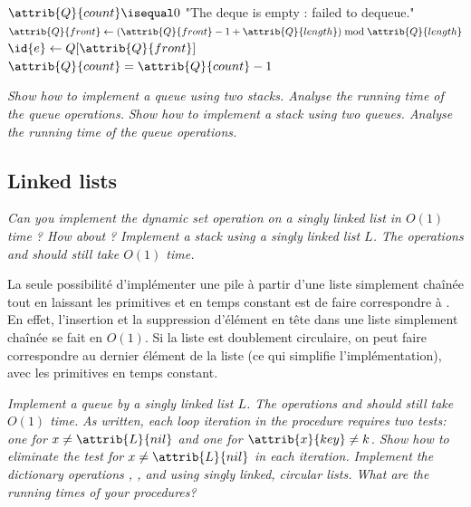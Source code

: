 \begin{description}
\begin{ex}
\begin{codebox}
\end{codebox}
\begin{codebox}
    \li \If $\attrib{Q}{count}\isequal0$ \Then
        \li \Error "The deque is empty : failed to dequeue." \End
    \li  $\attrib{Q}{front} \gets (\attrib{Q}{front} -1 + \attrib{Q}{length}) \bmod \attrib{Q}{length}$
    \li  $\id{e} \gets Q[\attrib{Q}{front}]$ 
    \li  $\attrib{Q}{count} = \attrib{Q}{count}-1$
    \li \Return {}
\end{codebox}
\end{ex}
 \textit{Show how to implement a queue using two stacks. Analyse the running time of the queue operations.}
 \textit{Show how to implement a stack using two queues. Analyse the running time of the queue operations.}


\end{description}

\subsection{Linked lists}
\label{sub:linked_lists}

\begin{description}
     \textit{Can you implement the dynamic set operation  on a singly linked list in $O(1)$ time ? How about  ?}
     \textit{Implement a stack using a singly linked list $L$. The operations  and  should still take $O(1)$ time.}
    \begin{exrev}
      La seule possibilité d'implémenter une pile à partir d'une liste simplement chaînée tout en laissant les primitives  et  en temps constant est de faire correspondre  à . En effet, l'insertion et la suppression d'élément en tête dans une liste simplement chaînée se fait en $O(1)$. Si la liste est doublement circulaire, on peut faire correspondre  au dernier élément de la liste (ce qui simplifie l'implémentation), avec les primitives en temps constant. 
    \end{exrev}
     \textit{Implement a queue by a singly linked list $L$. The operations  and  should still take $O(1)$ time.}
     \textit{As written, each loop iteration in the  procedure requires two tests: one for $x \neq \attrib {L}{nil}$ and one for $\attrib{x}{key} \neq k$. Show how to eliminate the test for $x \neq \attrib{L}{nil}$ in each iteration.}
     \textit{Implement the dictionary operations , , and  using singly linked, circular lists. What are the running times of your procedures?}
     \textit{}
     \textit{}
     \textit{}
\end{description}

